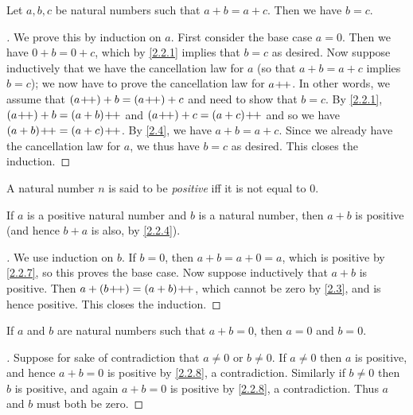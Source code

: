\begin{prop}\label{2.2.6}
  Let \(a, b, c\) be natural numbers such that \(a + b = a + c\).
  Then we have \(b = c\).
\end{prop}

\begin{proof}[]
  We prove this by induction on \(a\).
  First consider the base case \(a = 0\).
  Then we have \(0 + b = 0 + c\), which by \cref{2.2.1} implies that \(b = c\) as desired.
  Now suppose inductively that we have the cancellation law for \(a\) (so that \(a + b = a + c\) implies \(b = c\));
  we now have to prove the cancellation law for \(a\!+\!\!+\).
  In other words, we assume that \((a\!+\!\!+) + b = (a\!+\!\!+) + c\) and need to show that \(b = c\).
  By \cref{2.2.1}, \((a\!+\!\!+) + b = (a + b)\!+\!\!+\) and \((a\!+\!\!+) + c = (a + c)\!+\!\!+\) and so we have \((a + b)\!+\!\!+ = (a + c)\!+\!\!+\).
  By \cref{2.4}, we have \(a + b = a + c\).
  Since we already have the cancellation law for \(a\), we thus have \(b = c\) as desired.
  This closes the induction.
\end{proof}

\begin{defn}\label{2.2.7}
  A natural number \(n\) is said to be \emph{positive} iff it is not equal to \(0\).
\end{defn}

\begin{prop}\label{2.2.8}
  If \(a\) is a positive natural number and \(b\) is a natural number, then \(a + b\) is positive (and hence \(b + a\) is also, by \cref{2.2.4}).
\end{prop}

\begin{proof}[]
  We use induction on \(b\).
  If \(b = 0\), then \(a + b = a + 0 = a\), which is positive by \cref{2.2.7}, so this proves the base case.
  Now suppose inductively that \(a + b\) is positive.
  Then \(a + (b\!+\!\!+) = (a + b)\!+\!\!+\), which cannot be zero by \cref{2.3}, and is hence positive.
  This closes the induction.
\end{proof}

\begin{cor}\label{2.2.9}
  If \(a\) and \(b\) are natural numbers such that \(a + b = 0\), then \(a = 0\) and \(b = 0\).
\end{cor}

\begin{proof}[]
  Suppose for sake of contradiction that \(a \neq 0\) or \(b \neq 0\).
  If \(a \neq 0\) then \(a\) is positive, and hence \(a + b = 0\) is positive by \cref{2.2.8}, a contradiction.
  Similarly if \(b \neq 0\) then \(b\) is positive, and again \(a + b = 0\) is positive by \cref{2.2.8}, a contradiction.
  Thus \(a\) and \(b\) must both be zero.
\end{proof}

